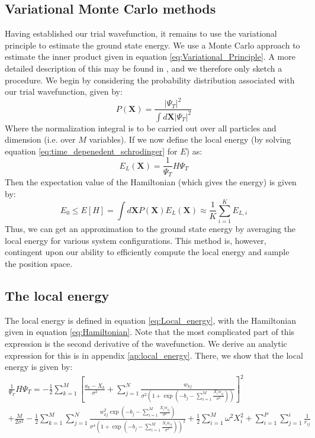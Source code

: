 \documentclass[a4paper, 10pt]{article}
\begin{document}
	\subsection{Variational Monte Carlo methods}
	Having established our trial wavefunction, it remains to use the variational principle to estimate the ground state energy. We use a Monte Carlo approach to estimate the inner product given in equation \ref{eq:Variational_Principle}. A more detailed description of this may be found in \cite{Hjorth-Jensen2015}, and we therefore only sketch a procedure. We begin by considering the probability distribution associated with our trial wavefunction, given by:
	\begin{equation}
	P(\mathbf{X})=\frac{|\Psi_T|^2}{\int d\mathbf{X}|\Psi_T|^2}
	\end{equation}
	Where the normalization integral is to be carried out over all particles and dimension (i.e. over $M$ variables). If we now define the local energy (by solving equation \ref{eq:time_depenedent_schrodinger} for $E$) as:
	\begin{equation}\label{eq:Local_energy}
	E_L(\mathbf{X})=\frac{1}{\Psi_T}H\Psi_T
	\end{equation}
	Then the expectation value of the Hamiltonian (which gives the energy) is given by:
	\begin{equation}\label{eq:energy_in_state_space}
	E_0 \leq E[H]=\int d\mathbf{X}P(\mathbf{X})E_L(\mathbf{X})\approx \frac{1}{K}\sum_{i=1}^{K}E_{L,i}
	\end{equation}
	Thus, we can get an approximation to the ground state energy by averaging the local energy for various system configurations. This method is, however, contingent upon our ability to efficiently compute the local energy and sample the position space.
	\subsection{The local energy}
	The local energy is defined in equation \ref{eq:Local_energy}, with the Hamiltonian given in equation \ref{eq:Hamiltonian}. Note that the most complicated part of this expression is the second derivative of the wavefunction. We derive an analytic expression for this is in appendix \ref{ap:local_energy}. There, we show that the local energy is given by:
	\begin{equation}
	\begin{split}
	\frac{1}{\Psi_T}H\Psi_T=-\frac{1}{2}\sum_{k=1}^M\left[\frac{a_k-X_k}{\sigma^2}+\sum_{j=1}^N \frac{w_{kj}}{\sigma^2 \left(1+ \exp \left(-b_j-\sum_{i=1}^{M} \frac{X_iw_{ij}}{\sigma^2}\right)\right)}\right]^2\\
	+\frac{M}{2\sigma^2}-\frac{1}{2}\sum_{k=1}^M\sum_{j=1}^N \frac{w_{kj}^2 \exp \left(-b_j-\sum_{i=1}^{M}\frac{X_iw_{ij}}{\sigma^2} \right)}{\sigma^4\left(1+ \exp \left(-b_j-\sum_{i=1}^{M} \frac{X_iw_{ij}}{\sigma^2}\right)\right)^2}+\frac{1}{2}\sum_{i=1}^M\omega^2 X_i^2+\sum_{i=1}^P \sum_{j=1}^i \frac{1}{r_{ij}}
	\end{split}
	\end{equation}
\end{document}
